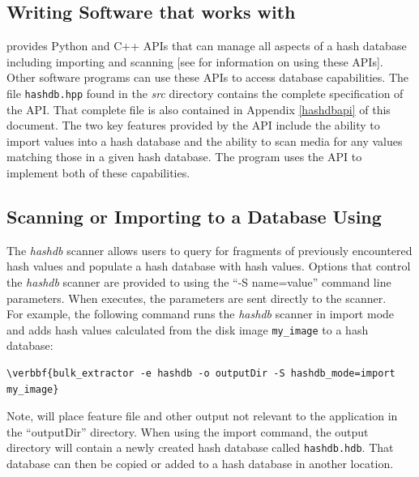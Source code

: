 \documentclass[11pt,fleqn]{article} %
\begin{document}
\subsection{Writing Software that works with \hdb}
\label{APISection}
\hdb provides Python and C++ APIs that can manage all aspects of a hash database
including importing and scanning [see \textbf{} for information on using these APIs].
Other software programs can use these APIs to access database capabilities. The file \texttt{hashdb.hpp} found in the \textit{src} directory contains the complete specification of the API. That complete file is also contained in Appendix \ref{hashdbapi} of this document.  The two key features provided by the API include the ability to import values into a hash database and the ability to scan media for any values matching those in a given hash database.  The \bulk program uses the \hdb API to implement both of these capabilities.\\

\subsection{Scanning or Importing to a Database Using \bulk}
\label{bulkextractorSection}
The \bulk \textit{hashdb} scanner allows users to query for fragments of previously encountered hash values and populate a hash database with hash values. Options that control the \textit{hashdb} scanner are provided to \bulk using the ``-S name=value'' command line parameters. When \bulk executes, the parameters are sent directly to the scanner.\\

For example, the following command runs the \bulk \textit{hashdb} scanner in import mode and adds hash values calculated from the disk image \texttt{my\_image} to a hash database:
\begin{Verbatim}[commandchars=\\\{\}]
\verbbf{bulk_extractor -e hashdb -o outputDir -S hashdb_mode=import my_image}
\end{Verbatim}
Note, \bulk will place feature file and other output not relevant to the \hdb application in the ``outputDir'' directory. When using the import command, the output directory will contain a newly created hash database called \texttt{hashdb.hdb}. That database can then be copied or added to a hash database in another location.
\end{document}
